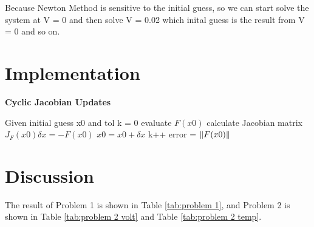 \documentclass{article}
\DeclarePairedDelimiter{\norm}{\lVert}{\rVert}
\begin{document}
Because Newton Method is sensitive to the initial guess, so we can start solve the system at V = 0 and then solve V = 0.02 which inital guess is
the result from V = 0 and so on.
\newpage

\section{Implementation}
\begin{algorithm}[H]
    \caption{\textbf{Cyclic Jacobian Updates}}
    \begin{algorithmic}
        \State Given initial guess x0 and tol
        \State k = 0
            \State evaluate $F(x0)$
                \State calculate Jacobian matrix
            \EndIf
            \State $J_F(x0)\delta{x} = -F(x0)$
            \State $x0 = x0 + \delta{x}$
            \State k++
            \State error = $\norm{F(x0)}$
        \EndWhile
    \end{algorithmic}
\end{algorithm}

\section{Discussion}
The result of Problem 1 is shown in Table \ref{tab:problem 1}, and Problem 2 is shown in Table \ref{tab:problem 2 volt} and 
Table \ref{tab:problem 2 temp}.
\end{document}
